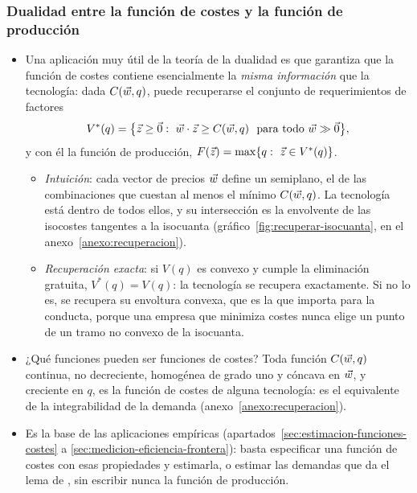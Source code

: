 \documentclass[11pt]{article}
\begin{document}
\begin{infografia}[H]
\centering
\caption{Esquema de dualidad de la empresa: problemas, soluciones, funciones valor y relaciones entre ellas}\label{figu:esquema-dualidad}
\end{infografia}

\subsubsection{Dualidad entre la función de costes y la función de producción}\label{sec:dualidad-funcion-costes}

\begin{itemize}
\item Una aplicación muy útil de la teoría de la dualidad es que garantiza que la función de costes contiene esencialmente la \emph{misma información} que la tecnología: dada $C(\vec{w},q)$, puede recuperarse el conjunto de requerimientos de factores\nocite{Shephard1953Cost,McFadden1978Cost}
  \begin{equation}
  V^*(q)=\big\{\vect{z}\geq\vect{0}:\ \vect{w}\cdot\vect{z}\geq C(\vect{w},q)\ \ \text{para todo }\vect{w}\gg\vect{0}\big\}, \label{eq:recuperar-v}
  \end{equation}
  y con él la función de producción, $F(\vect{z})=\max\{q:\ \vect{z}\in V^*(q)\}$.
  \begin{itemize}
  \item \emph{Intuición}: cada vector de precios $\vec{w}$ define un semiplano, el de las combinaciones que cuestan al menos el mínimo $C(\vec{w},q)$. La tecnología está dentro de todos ellos, y su intersección es la envolvente de las isocostes tangentes a la isocuanta (gráfico~\ref{fig:recuperar-isocuanta}, en el anexo~\ref{anexo:recuperacion}).
  \item \emph{Recuperación exacta}: si $V(q)$ es convexo y cumple la eliminación gratuita, $V^*(q)=V(q)$: la tecnología se recupera exactamente. Si no lo es, se recupera su envoltura convexa, que es la que importa para la conducta, porque una empresa que minimiza costes nunca elige un punto de un tramo no convexo de la isocuanta\nocite{MasColellWhinstonGreen1995}.
  \end{itemize}
\item ¿Qué funciones pueden ser funciones de costes? Toda función $C(\vec{w},q)$ continua, no decreciente, homogénea de grado uno y cóncava en $\vec{w}$, y creciente en $q$, es la función de costes de alguna tecnología\nocite{Shephard1953Cost,Uzawa1964Duality}: es el equivalente de la integrabilidad de la demanda (anexo~\ref{anexo:recuperacion}).
\item Es la base de las aplicaciones empíricas (apartados~\ref{sec:estimacion-funciones-costes} a \ref{sec:medicion-eficiencia-frontera}): basta especificar una función de costes con esas propiedades y estimarla, o estimar las demandas que da el lema de , sin escribir nunca la función de producción\nocite{Diewert1971Application,Diewert1974Applications}.
\end{itemize}
\end{document}
